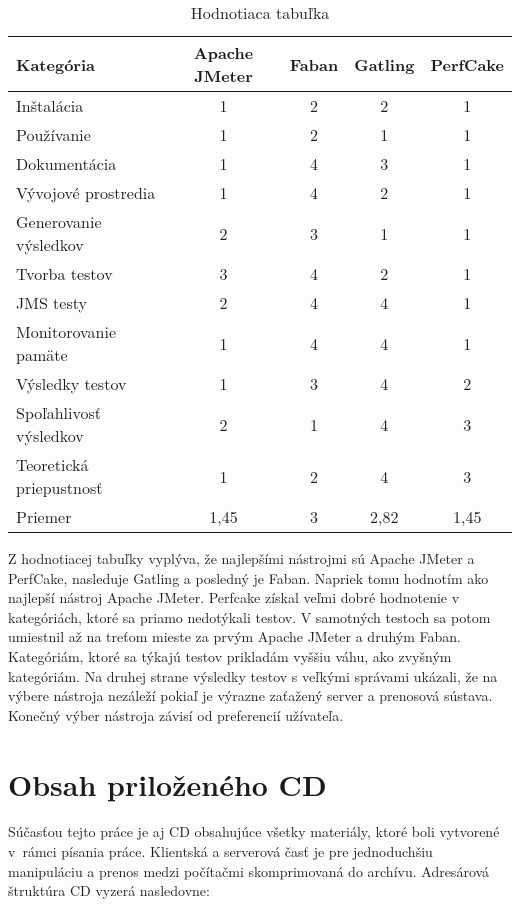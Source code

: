 \documentclass[12pt,oneside,final]{fithesis-utf8}
\begin{document}
\begin{table}[h!]
\begin{center}
\begin{tabular}{ | l | c | c | c | c |}
		\hline
		 \textbf{Kategória} & \textbf{Apache JMeter} & \textbf{Faban} & \textbf{Gatling} & \textbf{PerfCake} \\ \hline
		 Inštalácia & 1 & 2 & 2 & 1 \\ \hline
		 Používanie & 1 & 2 & 1 & 1 \\ \hline
		 Dokumentácia & 1 & 4 & 3 & 1 \\ \hline
		 Vývojové prostredia & 1 & 4 & 2 & 1 \\ \hline
		 Generovanie výsledkov & 2 & 3 & 1 & 1 \\ \hline
		 Tvorba testov & 3 & 4 & 2 & 1 \\ \hline
 		 JMS testy & 2 & 4 & 4 & 1 \\ \hline
		 Monitorovanie pamäte & 1 & 4 & 4 & 1 \\ \hline
		 Výsledky testov & 1 & 3 & 4 & 2 \\ \hline
		 Spoľahlivosť výsledkov & 2 & 1 & 4 & 3 \\ \hline
		 Teoretická priepustnosť & 1 & 2 & 4 & 3 \\ \hline
		 Priemer & 1,45 & 3 & 2,82 & 1,45 \\ \hline
		 
\end{tabular}
\end{center}
\caption{Hodnotiaca tabuľka}
\end{table}

Z hodnotiacej tabuľky vyplýva, že najlepšími nástrojmi sú Apache JMeter a PerfCake, nasleduje Gatling a posledný je Faban. Napriek tomu hodnotím ako najlepší nástroj Apache JMeter. Perfcake získal veľmi dobré hodnotenie v kategóriách, ktoré sa priamo nedotýkali testov. V samotných testoch sa potom umiestnil až na treťom mieste za prvým Apache JMeter a druhým Faban. Kategóriám, ktoré sa týkajú testov prikladám vyššiu váhu, ako zvyšným kategóriám. Na druhej strane výsledky testov s veľkými správami ukázali, že na výbere nástroja nezáleží pokiaľ je výrazne zaťažený server a prenosová sústava. Konečný výber nástroja závisí od preferencií užívateľa.




\appendix
\chapter{Obsah priloženého CD}
Súčasťou tejto práce je aj CD obsahujúce všetky materiály, ktoré boli vytvorené v~rámci písania práce. Klientská a serverová časť je pre jednoduchšiu manipuláciu a prenos medzi počítačmi skomprimovaná do archívu. Adresárová štruktúra CD vyzerá nasledovne:
\end{document}
